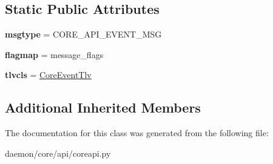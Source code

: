 \subsection*{Static Public Attributes}
\begin{DoxyCompactItemize}
\item 
\hypertarget{classcore_1_1api_1_1coreapi_1_1_core_event_message_a2b5723904c7fd3c39ed10140afa36b0c}{{\bfseries msgtype} = C\+O\+R\+E\+\_\+\+A\+P\+I\+\_\+\+E\+V\+E\+N\+T\+\_\+\+M\+S\+G}\label{classcore_1_1api_1_1coreapi_1_1_core_event_message_a2b5723904c7fd3c39ed10140afa36b0c}

\item 
\hypertarget{classcore_1_1api_1_1coreapi_1_1_core_event_message_a0e8ff76ea66aee972ec28d88f2f2caaf}{{\bfseries flagmap} = message\+\_\+flags}\label{classcore_1_1api_1_1coreapi_1_1_core_event_message_a0e8ff76ea66aee972ec28d88f2f2caaf}

\item 
\hypertarget{classcore_1_1api_1_1coreapi_1_1_core_event_message_a4b693bc3735325968c2a5665abc5b929}{{\bfseries tlvcls} = \hyperlink{classcore_1_1api_1_1coreapi_1_1_core_event_tlv}{Core\+Event\+Tlv}}\label{classcore_1_1api_1_1coreapi_1_1_core_event_message_a4b693bc3735325968c2a5665abc5b929}

\end{DoxyCompactItemize}
\subsection*{Additional Inherited Members}


The documentation for this class was generated from the following file\+:\begin{DoxyCompactItemize}
\item 
daemon/core/api/coreapi.\+py\end{DoxyCompactItemize}
